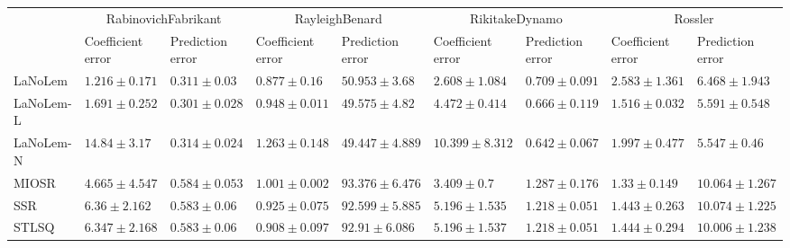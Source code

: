\begin{table*}
{\begin{tabular}{lllllllll}
 & \multicolumn{2}{c}{RabinovichFabrikant} & \multicolumn{2}{c}{RayleighBenard} & \multicolumn{2}{c}{RikitakeDynamo} & \multicolumn{2}{c}{Rossler} \\
 & Coefficient error & Prediction error & Coefficient error & Prediction error & Coefficient error & Prediction error & Coefficient error & Prediction error \\
\midrule
LaNoLem & $\mathbf{1.216}\pm 0.171$ & $0.311\pm 0.03$ & $\mathbf{0.877}\pm 0.16$ & $50.953\pm 3.68$ & $\mathbf{2.608}\pm 1.084$ & $0.709\pm 0.091$ & $2.583\pm 1.361$ & $6.468\pm 1.943$ \\
LaNoLem-L & $1.691\pm 0.252$ & $\mathbf{0.301}\pm 0.028$ & $0.948\pm 0.011$ & $49.575\pm 4.82$ & $4.472\pm 0.414$ & $0.666\pm 0.119$ & $1.516\pm 0.032$ & $5.591\pm 0.548$ \\
LaNoLem-N & $14.84\pm 3.17$ & $0.314\pm 0.024$ & $1.263\pm 0.148$ & $\mathbf{49.447}\pm 4.889$ & $10.399\pm 8.312$ & $\mathbf{0.642}\pm 0.067$ & $1.997\pm 0.477$ & $\mathbf{5.547}\pm 0.46$ \\
MIOSR & $4.665\pm 4.547$ & $0.584\pm 0.053$ & $1.001\pm 0.002$ & $93.376\pm 6.476$ & $3.409\pm 0.7$ & $1.287\pm 0.176$ & $\mathbf{1.33}\pm 0.149$ & $10.064\pm 1.267$ \\
SSR & $6.36\pm 2.162$ & $0.583\pm 0.06$ & $0.925\pm 0.075$ & $92.599\pm 5.885$ & $5.196\pm 1.535$ & $1.218\pm 0.051$ & $1.443\pm 0.263$ & $10.074\pm 1.225$ \\
STLSQ & $6.347\pm 2.168$ & $0.583\pm 0.06$ & $0.908\pm 0.097$ & $92.91\pm 6.086$ & $5.196\pm 1.537$ & $1.218\pm 0.051$ & $1.444\pm 0.294$ & $10.006\pm 1.238$ \\

\midrule


\end{tabular}}
\end{table*}
